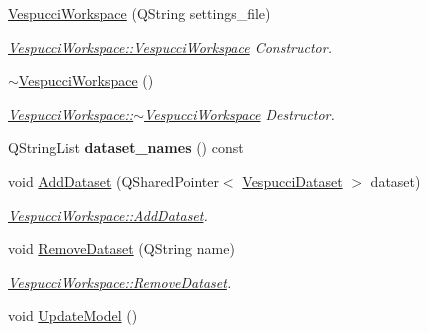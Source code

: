 \begin{DoxyCompactItemize}
\item 
\hyperlink{class_vespucci_workspace_a07e203d119fd16cb6c32f12f5ca2cada}{Vespucci\+Workspace} (Q\+String settings\+\_\+file)\hypertarget{class_vespucci_workspace_a07e203d119fd16cb6c32f12f5ca2cada}{}\label{class_vespucci_workspace_a07e203d119fd16cb6c32f12f5ca2cada}

\begin{DoxyCompactList}\small\item\em \hyperlink{class_vespucci_workspace_a07e203d119fd16cb6c32f12f5ca2cada}{Vespucci\+Workspace\+::\+Vespucci\+Workspace} Constructor. \end{DoxyCompactList}\item 
\hyperlink{class_vespucci_workspace_a33a6d0777091160a88bc78b7d5ce6617}{$\sim$\+Vespucci\+Workspace} ()\hypertarget{class_vespucci_workspace_a33a6d0777091160a88bc78b7d5ce6617}{}\label{class_vespucci_workspace_a33a6d0777091160a88bc78b7d5ce6617}

\begin{DoxyCompactList}\small\item\em \hyperlink{class_vespucci_workspace_a33a6d0777091160a88bc78b7d5ce6617}{Vespucci\+Workspace\+::$\sim$\+Vespucci\+Workspace} Destructor. \end{DoxyCompactList}\item 
Q\+String\+List {\bfseries dataset\+\_\+names} () const \hypertarget{class_vespucci_workspace_a31c9d7cd424905860313769a75d1f8d0}{}\label{class_vespucci_workspace_a31c9d7cd424905860313769a75d1f8d0}

\item 
void \hyperlink{class_vespucci_workspace_a9dac697d9be0cd6549fd849136ec9f73}{Add\+Dataset} (Q\+Shared\+Pointer$<$ \hyperlink{class_vespucci_dataset}{Vespucci\+Dataset} $>$ dataset)
\begin{DoxyCompactList}\small\item\em \hyperlink{class_vespucci_workspace_a9dac697d9be0cd6549fd849136ec9f73}{Vespucci\+Workspace\+::\+Add\+Dataset}. \end{DoxyCompactList}\item 
void \hyperlink{class_vespucci_workspace_a46e8312e66cac4cf8c1d975dd8b24725}{Remove\+Dataset} (Q\+String name)
\begin{DoxyCompactList}\small\item\em \hyperlink{class_vespucci_workspace_a46e8312e66cac4cf8c1d975dd8b24725}{Vespucci\+Workspace\+::\+Remove\+Dataset}. \end{DoxyCompactList}\item 
void \hyperlink{class_vespucci_workspace_a892e53b99bb8cd45b2384c8aa9c0b79f}{Update\+Model} ()\hypertarget{class_vespucci_workspace_a892e53b99bb8cd45b2384c8aa9c0b79f}{}\label{class_vespucci_workspace_a892e53b99bb8cd45b2384c8aa9c0b79f}


\end{DoxyCompactItemize}
